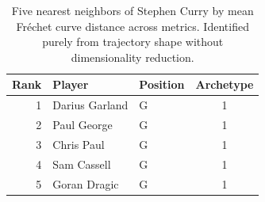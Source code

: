 \begin{table}[htbp]
  \centering\small
  \begin{tabular}{rllc}
    \toprule
    Rank & Player & Position & Archetype \\
    \midrule
    1 & Darius Garland & G & 1 \\
    2 & Paul George & G & 1 \\
    3 & Chris Paul & G & 1 \\
    4 & Sam Cassell & G & 1 \\
    5 & Goran Dragic & G & 1 \\
    \bottomrule
  \end{tabular}
  \caption{Five nearest neighbors of Stephen Curry by mean Fr\'{e}chet curve distance across metrics. Identified purely from trajectory shape without dimensionality reduction.}
  \label{tab:Stephen_Curry_frechet_curve_neighbors}
\end{table}

